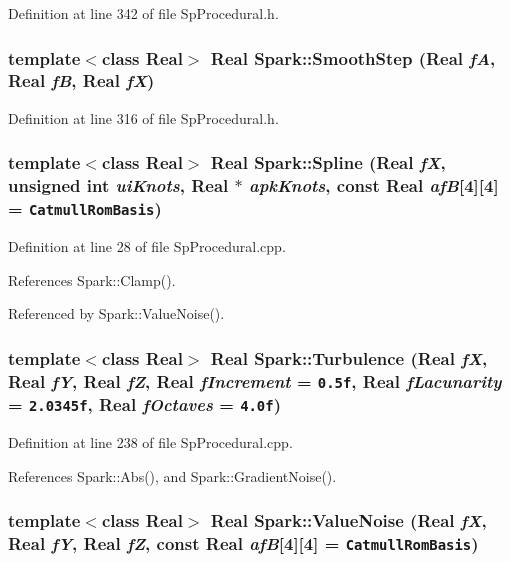 Definition at line 342 of file Sp\-Procedural.h.
\subsubsection{\setlength{\rightskip}{0pt plus 5cm}template$<$class Real$>$ Real Spark::Smooth\-Step (Real {\em f\-A}, Real {\em f\-B}, Real {\em f\-X})}\label{namespaceSpark_a102}


Definition at line 316 of file Sp\-Procedural.h.
\subsubsection{\setlength{\rightskip}{0pt plus 5cm}template$<$class Real$>$ Real Spark::Spline (Real {\em f\-X}, unsigned int {\em ui\-Knots}, Real $\ast$ {\em apk\-Knots}, const Real {\em af\-B}[4][4] = {\tt CatmullRomBasis})}\label{namespaceSpark_a72}


Definition at line 28 of file Sp\-Procedural.cpp.

References Spark::Clamp().

Referenced by Spark::Value\-Noise().
\subsubsection{\setlength{\rightskip}{0pt plus 5cm}template$<$class Real$>$ Real Spark::Turbulence (Real {\em f\-X}, Real {\em f\-Y}, Real {\em f\-Z}, Real {\em f\-Increment} = {\tt 0.5f}, Real {\em f\-Lacunarity} = {\tt 2.0345f}, Real {\em f\-Octaves} = {\tt 4.0f})}\label{namespaceSpark_a77}


Definition at line 238 of file Sp\-Procedural.cpp.

References Spark::Abs(), and Spark::Gradient\-Noise().
\subsubsection{\setlength{\rightskip}{0pt plus 5cm}template$<$class Real$>$ Real Spark::Value\-Noise (Real {\em f\-X}, Real {\em f\-Y}, Real {\em f\-Z}, const Real {\em af\-B}[4][4] = {\tt CatmullRomBasis})}\label{namespaceSpark_a75}



